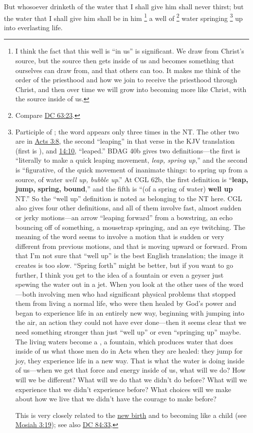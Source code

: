 			But whosoever drinketh of the water that I shall give him shall never thirst; but the water that I shall give him shall be in him%
				\footnote{%
					I think the fact that this well is ``in us'' is significant. We draw from Christ's source, but the source then gets inside of us and becomes something that ourselves can draw from, and that others can too. It makes me think of the order of the priesthood and how we join to receive the priesthood through Christ, and then over time we will grow into becoming more like Christ, with the source inside of us.
					}
			a well of%
				\footnote{%
					Compare \hyperref[DC63-23]{DC 63:23}.
					}
			water springing%
				\footnote{%
					Participle of ; the word appears only three times in the NT. The other two are in \hyperref[ACTS-3-8]{Acts 3:8}, the second ``leaping'' in that verse in the KJV translation (first is ), and \hyperref[ACTS-14-10]{14:10}, ``leaped.'' BDAG 40b gives two definitions---the first is ``literally to make a quick leaping movement, \textit{leap, spring up},'' and the second is ``figurative, of the quick movement of inanimate things: to spring up from a source, of water \textit{well up, bubble up}.'' At CGL 62b, the first definition is ``\textbf{leap, jump, spring, bound},'' and the fifth is ``(of a spring of water) \textbf{well up} NT.'' So the ``well up'' definition is noted as belonging to the NT here. CGL also gives four other definitions, and all of them involve fast, almost sudden or jerky motions---an arrow ``leaping forward'' from a bowstring, an echo bouncing off of something, a mousetrap springing, and an eye twitching. The meaning of the word seems to involve a motion that is sudden or very different from previous motions, and that is moving upward or forward. From that I'm not sure that ``well up'' is the best English translation; the image it creates is too slow. ``Spring forth'' might be better, but if you want to go further, I think you get to the idea of a fountain or even a geyser just spewing the water out in a jet. When you look at the other uses of the word---both involving men who had significant physical problems that stopped them from living a normal life, who were then healed by God's power and began to experience life in an entirely new way, beginning with jumping into the air, an action they could not have ever done---then it seems clear that we need something stronger than just ``well up'' or even ``springing up'' maybe. The living waters become a , a fountain, which produces water that does inside of us what those men do in Acts when they are healed: they jump for joy, they experience life in a new way. That is what the water is doing inside of us---when we get that force and energy inside of us, what will we do? How will we be different? What will we do that we didn't do before? What will we experience that we didn't experience before? What choices will we make about how we live that we didn't have the courage to make before?
					
					This is very closely related to the \hyperref[NEWBIRTH]{new birth} and to becoming like a child (see \hyperref[MOSIAH-3-19]{Mosiah 3:19}); see also \hyperref[DC84-33]{DC 84:33}, 
					}
			up into everlasting life.

